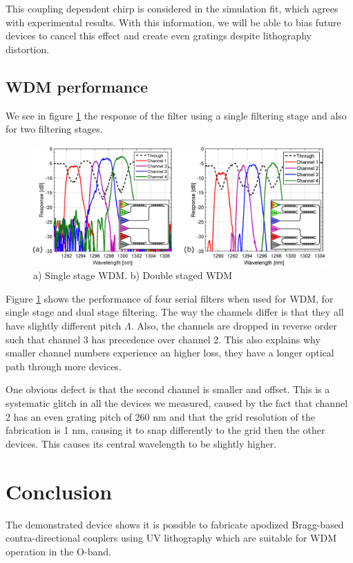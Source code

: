 \documentclass[letterpaper,10pt]{article}
\begin{document}
This coupling dependent chirp is considered in the simulation fit, which agrees with experimental results. With this information, we will be able to bias future devices to cancel this effect and create even gratings despite lithography distortion.

\subsection{WDM performance}
We see in figure \ref{fig:WDM} the response of the filter using a single filtering stage and also for two filtering stages.
\begin{figure}[htbp]
	\centering
	\includegraphics[width=.99\columnwidth]{WDM}
	\caption{a) Single stage WDM. b) Double staged WDM }
	\label{fig:WDM}
\end{figure}

Figure \ref{fig:WDM} shows the performance of four serial filters when used for WDM, for single stage and dual stage filtering. The way the channels differ is that they all have slightly different pitch $\Lambda$. Also, the channels are dropped in reverse order such that channel 3 has precedence over channel 2. This also explains why smaller channel numbers experience an higher loss, they have a longer optical path through more devices.

One obvious defect is that the second channel is smaller and offset. This is a systematic glitch in all the devices we measured, caused by the fact that channel 2 has an even grating pitch of 260 nm and that the grid resolution of the fabrication is 1 nm, causing it to snap differently to the grid then the other devices. This causes its central wavelength to be slightly higher.




\section{Conclusion}
The demonstrated device shows it is possible to fabricate apodized Bragg-based contra-directional couplers using UV lithography which are suitable for WDM operation in the O-band. 
\end{document}
